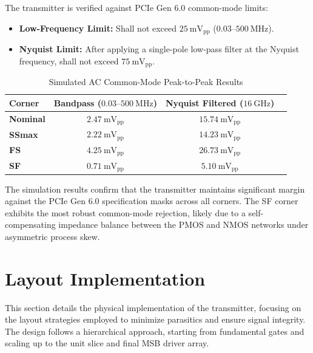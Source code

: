 The transmitter is verified against PCIe Gen 6.0 common-mode limits:
\begin{itemize}
    \item \textbf{Low-Frequency Limit:} Shall not exceed $25~\text{mV}_{\text{pp}}$ ($0.03\text{--}500~\text{MHz}$).
    \item \textbf{Nyquist Limit:} After applying a single-pole low-pass filter at the Nyquist frequency, shall not exceed $75~\text{mV}_{\text{pp}}$.
\end{itemize}

\begin{table}[H]
    \centering
    \caption{Simulated AC Common-Mode Peak-to-Peak Results}
    \label{tab:ac_cm_pp_results}
    \renewcommand{\arraystretch}{1.3}
    \begin{tabular}{lccc}
        \toprule
        \textbf{Corner} & \textbf{Bandpass ($0.03\text{--}500~\text{MHz}$)} & \textbf{Nyquist Filtered ($16~\text{GHz}$)} \\
        \midrule
        \textbf{Nominal} & $2.47~\text{mV}_{\text{pp}}$ & $15.74~\text{mV}_{\text{pp}}$ \\
        \textbf{SSmax}   & $2.22~\text{mV}_{\text{pp}}$ & $14.23~\text{mV}_{\text{pp}}$ \\
        \textbf{FS}      & $4.25~\text{mV}_{\text{pp}}$ & $26.73~\text{mV}_{\text{pp}}$ \\
        \textbf{SF}      & $0.71~\text{mV}_{\text{pp}}$ & $5.10~\text{mV}_{\text{pp}}$ \\
        \bottomrule
    \end{tabular}
\end{table}

The simulation results confirm that the transmitter maintains significant margin against the PCIe Gen 6.0 specification masks across all corners. 
The SF corner exhibits the most robust common-mode rejection, likely due to a self-compensating impedance balance between the PMOS and NMOS networks 
under asymmetric process skew.

\section{Layout Implementation}
\label{sec:layout}

This section details the physical implementation of the transmitter, focusing on the layout strategies employed to minimize parasitics 
and ensure signal integrity. The design follows a hierarchical approach, starting from fundamental gates and scaling up to the unit slice 
and final MSB driver array.

